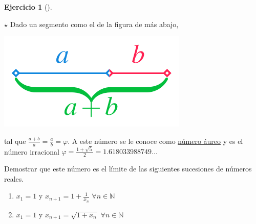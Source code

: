 \documentclass[
  a4paper,
]{scrreport}
\providecommand{\tightlist}{%
  \setlength{\itemsep}{0pt}\setlength{\parskip}{0pt}}\usepackage{longtable,booktabs,array}
\theoremstyle{definition}
\newtheorem{exercise}{Ejercicio}[chapter]
\theoremstyle{remark}
\begin{document}
\begin{exercise}[]\protect\hypertarget{exr-numero-aureo}{}\label{exr-numero-aureo}

\(\star\) Dado un segmento como el de la figura de más abajo,

\includegraphics{./img/sucesiones/numero-aureo.pdf}

tal que \(\frac{a+b}{a}=\frac{a}{b}=\varphi\). A este número se le
conoce como
\href{https://es.wikipedia.org/wiki/N\%C3\%BAmero_\%C3\%A1ureo}{número
áureo} y es el número irracional
\(\varphi=\frac{1+\sqrt{5}}{2}=1.618033988749\ldots\)

Demostrar que este número es el límite de las siguientes sucesiones de
números reales.

\begin{enumerate}
\def\labelenumi{\alph{enumi}.}
\tightlist
\item
  \(x_1=1\) y \(x_{n+1}=1+\frac{1}{x_n}\) \(\forall n\in \mathbb{N}\)
\item
  \(x_1=1\) y \(x_{n+1}=\sqrt{1+x_n}\) \(\forall n\in\mathbb{N}\)
\end{enumerate}

\end{exercise}
\end{document}
